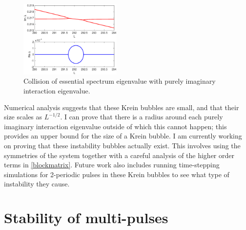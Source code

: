 \documentclass[12pt,reqno,oneside]{amsart}
\theoremstyle{definition}
\theoremstyle{remark}
\begin{document}
\begin{figure}
\includegraphics[width=0.45\textwidth]{images/kreinbubble1}
\caption{Collision of essential spectrum eigenvalue with purely imaginary interaction eigenvalue.}
\label{fig:kreinbubble1}
\end{figure}
Numerical analysis suggests that these Krein bubbles are small, and that their size scales as $L^{-1/2}$. I can prove that there is a radius around each purely imaginary interaction eigenvalue outside of which this cannot happen; this provides an upper bound for the size of a Krein bubble. I am currently working on proving that these instability bubbles actually exist. This involves using the symmetries of the system together with a careful analysis of the higher order terms in \eqref{blockmatrix}. Future work also includes running time-stepping simulations for 2-periodic pulses in these Krein bubbles to see what type of instability they cause.
\pagebreak
\section{Stability of multi-pulses}
\end{document}
